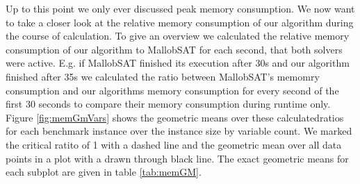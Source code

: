 \documentclass[12pt,a4paper,twoside]{scrartcl}
\numberwithin{equation}{section}
\begin{document}
\label{sec:GMs}
Up to this point we only ever discussed peak memory consumption. We now want to take a closer look at the relative memory consumption of our algorithm during the course of calculation. To give an overview we calculated the relative memory consumption of our algorithm to MallobSAT for each second, that both solvers were active. E.g. if MallobSAT finished its execution after 30s and our algorithm finished after 35s we calculated the ratio between MallobSAT's memomry consumption and our algorithms memory consumption for every second of the first 30 seconds to compare their memory consumption during runtime only. Figure \ref{fig:memGmVars} shows the geometric means over these calculatedratios for each benchmark instance over the instance size by variable count. We marked the critical ratito of 1 with a dashed line and the geometric mean over all data points in a plot with a drawn through black line. The exact geometric means for each subplot are given in table \ref{tab:memGM}.
\end{document}
